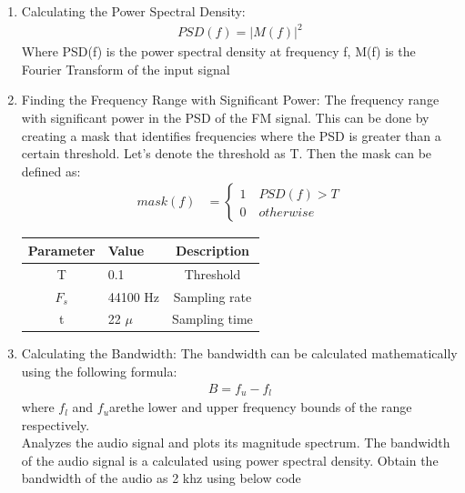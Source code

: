 \documentclass[journal,5pt,twocolumn]{IEEEtran}
\begin{document}
\begin{enumerate}
\item Calculating the Power Spectral Density:
\begin{align*}
PSD(f)=\lvert M(f) \rvert^2 
\end{align*}
Where PSD(f) is the power spectral density at frequency f, M(f) is the Fourier Transform of the input signal

\item Finding the Frequency Range with Significant Power:
The frequency range with significant power in the PSD of the FM signal. This can be done by creating a mask that identifies frequencies where the PSD is greater than a certain threshold. Let's denote the threshold as T. Then the mask can be defined as:
\begin{align*}
mask(f) &=
\begin{cases}
 1 \quad PSD(f) > T\\
0 \quad otherwise
\end{cases}
\end{align*}

\begin{tabular}{|c|l|c|}
    \hline 
    \textbf{Parameter} & \textbf{Value} &\textbf{Description} \\ \hline
    T&0.1&Threshold\\
    $F_s$ & 44100 Hz & Sampling rate\\ 
    t     & 22 $\mu$ & Sampling time\\  \hline
    \end{tabular}
\vspace{10mm}
\item Calculating the Bandwidth: The bandwidth can be calculated mathematically using the following formula:
\begin{align*}
B = f_u - f_l
\end{align*}
where $f_l $ and $f_u $arethe lower and upper frequency bounds of the range  respectively.\\
Analyzes the audio signal and plots its magnitude spectrum. The bandwidth of the audio signal is a calculated using power spectral density. Obtain the bandwidth of the audio as 2 khz using below code
\begin{center}
\end{center}
\end{enumerate}
\end{document}
